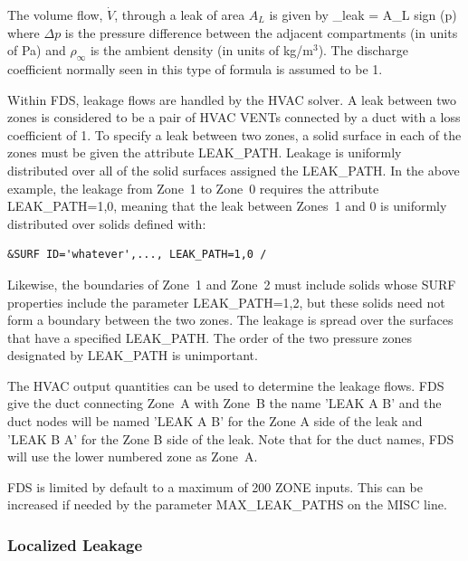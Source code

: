 \documentclass[11pt]{book}
\begin{document}
The volume flow, $\dot{V}$, through a leak of area $A_L$ is given by
\be  {}_{\rm leak} = A_L \; \hbox{sign} (\Delta p) \;  \ee
where $\Delta p$ is the pressure difference between the adjacent compartments (in units of Pa) and
$\rho_\infty$ is the ambient density (in units of kg/m$^3$). The discharge coefficient normally seen in this type of formula is assumed
to be 1.

Within FDS, leakage flows are handled by the HVAC solver.  A leak between two zones is considered to be a pair of HVAC {\ct VENT}s connected by a duct with a loss coefficient of 1.  To specify a leak between two zones, a solid surface in each of the zones must be given the attribute {\ct LEAK\_PATH}.  Leakage is uniformly distributed over all of the solid surfaces assigned the {\ct LEAK\_PATH}.  In the above example, the leakage from Zone~1 to Zone~0 requires the attribute
{\ct LEAK\_PATH=1,0}, meaning that the leak between Zones~1 and 0 is uniformly distributed
over solids defined with:
\begin{lstlisting}
&SURF ID='whatever',..., LEAK_PATH=1,0 /
\end{lstlisting}
Likewise, the boundaries of Zone~1 and Zone~2 must include solids whose {\ct SURF} properties include the parameter {\ct LEAK\_PATH=1,2}, but these solids need not form a boundary between the two zones. The leakage is spread over the surfaces that have a specified {\ct LEAK\_PATH}. The order of the two pressure zones designated by {\ct LEAK\_PATH} is unimportant.

The HVAC output quantities can be used to determine the leakage flows.  FDS give the duct connecting Zone~A with Zone~B the name {\ct 'LEAK A B'} and the duct nodes will be named {\ct 'LEAK A B'} for the Zone A side of the leak and {\ct 'LEAK B A'} for the Zone B side of the leak.  Note that for the duct names, FDS will use the lower numbered zone as Zone~A.

FDS is limited by default to a maximum of 200 {\ct ZONE} inputs.  This can be increased if needed by the parameter {\ct MAX\_LEAK\_PATHS} on the {\ct MISC} line.

\subsubsection{Localized Leakage}
\label{info:local_leakage}
\end{document}
